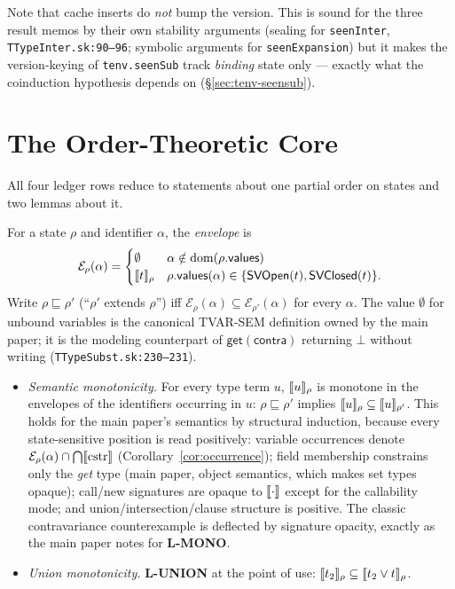 \documentclass[11pt]{article}
\newcommand{\SVOpen}{\mathsf{SVOpen}}
\newcommand{\SVClosed}{\mathsf{SVClosed}}
\newcommand{\env}[2]{\mathcal{E}_{#1}(#2)}   %
\newcommand{\stle}{\sqsubseteq}              %
\begin{document}
Note that cache inserts do \emph{not} bump the version. This is sound for
the three result memos by their own stability arguments (sealing for
\texttt{seenInter}, \texttt{TTypeInter.sk:90--96}; symbolic arguments for
\texttt{seenExpansion}) but it makes the version-keying of
\texttt{tenv.seenSub} track \emph{binding} state only — exactly what the
coinduction hypothesis depends on (\S\ref{sec:tenv-seensub}).

\section{The Order-Theoretic Core}
\label{sec:order}

All four ledger rows reduce to statements about one partial order on
states and two lemmas about it.

\begin{definition}
\label{def:order}
For a state $\rho$ and identifier $\alpha$, the \emph{envelope} is
\[
\env{\rho}{\alpha} =
\begin{cases}
\emptyset & \alpha \notin \mathrm{dom}(\rho.\mathsf{values})\\
\sem{t}_\rho & \rho.\mathsf{values}(\alpha) \in
  \{\SVOpen(t), \SVClosed(t)\}.
\end{cases}
\]
Write $\rho \stle \rho'$ (``$\rho'$ extends $\rho$'') iff
$\env{\rho}{\alpha} \subseteq \env{\rho'}{\alpha}$ for every $\alpha$.
The value $\emptyset$ for unbound variables is the canonical TVAR-SEM
definition owned by the main paper; it is the modeling counterpart
of $\mathsf{get}(\mathsf{contra})$ returning $\bot$ without writing
(\texttt{TTypeSubst.sk:230--231}).
\end{definition}

\begin{definition}
\label{def:conditions}
\begin{itemize}
\item[\textbf{(M1)}] \emph{Semantic monotonicity.} For every type term
  $u$, $\llbracket u \rrbracket_\rho$ is monotone in the envelopes of the identifiers
  occurring in $u$: $\rho \stle \rho'$ implies
  $\llbracket u \rrbracket_\rho \subseteq \llbracket u \rrbracket_{\rho'}$. This holds for the main
  paper's semantics by structural induction, because every
  state-sensitive position is read positively: variable occurrences
  denote $\env{\rho}{\alpha} \cap \bigcap \sem{\mathrm{cstr}}$
  (Corollary~\ref{cor:occurrence}); field membership constrains only the
  \emph{get} type (main paper, object semantics, which makes set
  types opaque); call/new signatures are opaque to $\llbracket \cdot \rrbracket$ except
  for the callability mode; and union/intersection/clause structure is
  positive. The classic contravariance counterexample is deflected by
  signature opacity, exactly as the main paper notes for \textbf{L-MONO}.
\item[\textbf{(M2)}] \emph{Union monotonicity.} \textbf{L-UNION} at the
  point of use: $\llbracket t_2 \rrbracket_\rho \subseteq \llbracket t_2 \vee t \rrbracket_\rho$.
\end{itemize}
\end{definition}
\end{document}
